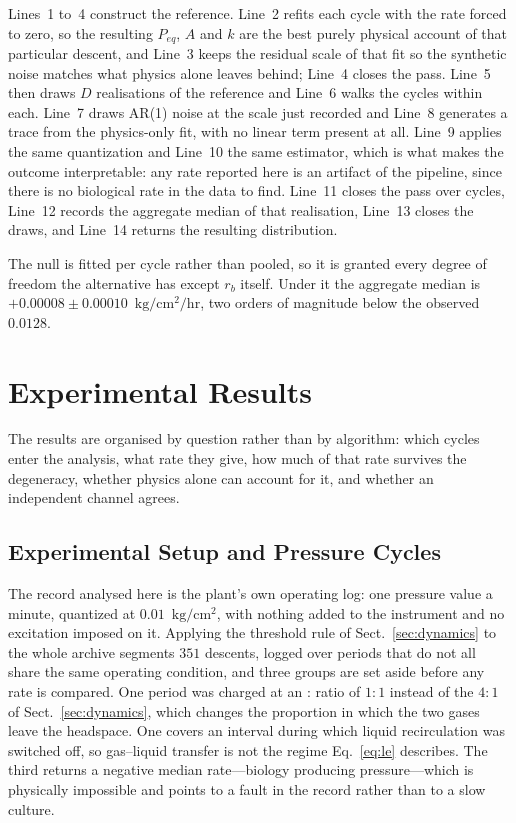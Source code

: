 \documentclass[runningheads]{llncs}
\newcommand{\pu}{\ensuremath{\mathrm{kg/cm^{2}}}}
\newcommand{\ratu}{\ensuremath{\mathrm{kg/cm^{2}/hr}}}
\newcommand{\rb}{\ensuremath{r_{b}}}
\begin{document}
Lines~1 to~4
construct the reference. Line~2 refits each cycle with the rate
forced to zero, so the resulting $P_{eq}$, $A$ and $k$ are the best
purely physical account of that particular descent, and Line~3 keeps
the residual scale of that fit so the synthetic noise matches what
physics alone leaves behind; Line~4 closes the pass. Line~5 then
draws $D$ realisations of the reference and Line~6 walks the cycles
within each. Line~7 draws AR(1) noise at the scale just recorded and
Line~8 generates a trace from the physics-only fit, with no linear
term present at all. Line~9 applies the same quantization and
Line~10 the same estimator, which is what makes the outcome
interpretable: any rate reported here is an artifact of the pipeline,
since there is no biological rate in the data to find. Line~11 closes
the pass over cycles, Line~12 records the aggregate median of that
realisation, Line~13 closes the draws, and Line~14 returns the
resulting distribution.

The null is fitted per cycle rather than pooled, so it is granted every
degree of freedom the alternative has except $\rb$ itself. Under it the
aggregate median is
$+0.00008 \pm 0.00010$~\ratu{}, two orders of magnitude below the
observed $0.0128$.

\section{Experimental Results}
\label{sec:results}

The results are organised by question rather than by algorithm: which
cycles enter the analysis, what rate they give, how much of that rate
survives the degeneracy, whether physics alone can account for it, and
whether an independent channel agrees.

\subsection{Experimental Setup and Pressure Cycles}
\label{sec:setup}

The record analysed here is the plant's own operating log: one pressure
value a minute, quantized at $0.01$~\pu{}, with nothing added to the
instrument and no excitation imposed on it. Applying the threshold rule
of Sect.~\ref{sec:dynamics} to the whole archive segments $351$
descents, logged over periods that do not all share the same operating
condition, and three groups are set aside before any rate is compared.
One period was charged at an : ratio of $1{:}1$ instead
of the $4{:}1$ of Sect.~\ref{sec:dynamics}, which changes the
proportion in which the two gases leave the headspace. One covers an
interval during which liquid recirculation was switched off, so
gas--liquid transfer is not the regime Eq.~\eqref{eq:le} describes.
The third returns a negative median rate---biology producing
pressure---which is physically impossible and points to a fault in the
record rather than to a slow culture.
\end{document}
